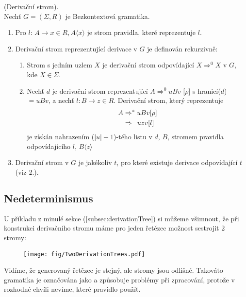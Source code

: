 \begin{defn}
  (Derivační strom). \cite[str. 92]{MedunaIFJ}\\
  Nechť $G = (\Sigma, R)$ je Bezkontextová gramatika.\\
  \begin{enumerate}
    \item Pro $l$: $A \rightarrow x \in R, A\langle x\rangle$ je strom pravidla, které reprezentuje $l$.
    \item Derivační strom reprezentující derivace v $G$ je definován rekurzivně:
    \begin{enumerate}
      \item Strom s jedním uzlem $X$ je derivační strom odpovídající $X \Rightarrow^0 X$ v $G$, kde $X \in \Sigma$.
      \item Nechť $d$ je derivační strom reprezentující
            $A \Rightarrow^0 uBv$ [$\rho$] s hranicí($d$) $ = uBv$, a nechť $l: B \rightarrow z \in R$.
            Derivační strom, který reprezentuje
            \begin{align}
                A & \Rightarrow^* uBv [\rho] \nonumber\\
                  & \Rightarrow \hphantom{*} uzv [l] \nonumber
            \end{align}
            je získán nahrazením ($|u|+1$)-tého listu v $d$, $B$, stromem pravidla odpovídajícího $l$, $B\langle z\rangle$
    \end{enumerate}
    \item Derivační strom v $G$ je jakékoliv $t$, pro které existuje derivace odpovídající $t$ (viz 2.).
  \end{enumerate}
  \vspace{-0.2cm}
\end{defn}

\subsection{Nedeterminismus}
\label{subec:nondeterminsm}

U příkladu z minulé sekce (\ref{subsec:derivationTree}) si můžeme všimnout,
že při konstrukci derivačního stromu máme pro jeden řetězec možnost sestrojit
2 stromy:

\begin{figure}[H]
  \centering
  \texttt{[image: fig/TwoDerivationTrees.pdf]}
\end{figure}

Vidíme, že generovaný řetězec je stejný, ale stromy jsou odlišné.
Takováto gramatika je označována jako  a způsobuje problémy při
zpracování, protože v rozhodné chvíli nevíme, které pravidlo použít.\\


